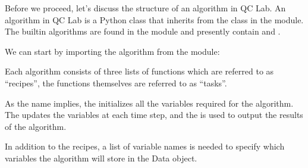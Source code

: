 \documentclass[letterpaper,10pt,english]{sphinxmanual}
\begin{document}
\sphinxAtStartPar
Before we proceed, let’s discuss the structure of an algorithm in QC Lab. An algorithm in QC Lab is a Python
class that inherits from the  class in the  module. The built\sphinxhyphen{}in algorithms are
found in the  module and presently contain  and
.

\sphinxAtStartPar
We can start by importing the  algorithm from the  module:

\begin{sphinxVerbatim}[commandchars=\\\{\}]
   
\end{sphinxVerbatim}

\sphinxAtStartPar
Each algorithm consists of three lists of functions which are referred to as “recipes”, the functions themselves are
referred to as “tasks”.

\begin{sphinxVerbatim}[commandchars=\\\{\}]


\end{sphinxVerbatim}

\sphinxAtStartPar
As the name implies, the  initializes all the variables required for the algorithm. The 
updates the variables at each time step, and the  is used to output the results of the algorithm.

\sphinxAtStartPar
In addition to the recipes, a list of variable names is needed to specify which variables the algorithm will store in the Data object.

\begin{sphinxVerbatim}[commandchars=\\\{\}]
\end{sphinxVerbatim}
\end{document}
